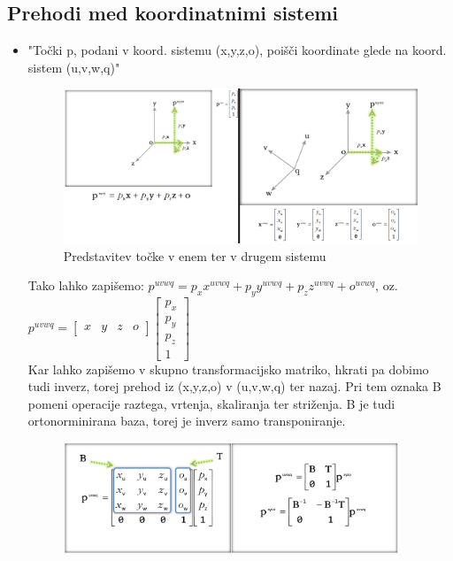 \documentclass{article}
\begin{document}
\subsection{Prehodi med koordinatnimi sistemi}
\begin{itemize}
    \item "Točki p, podani v koord. sistemu (x,y,z,o), poišči koordinate glede na koord. sistem (u,v,w,q)"
        \begin{figure}[H]
        \centering
        \includegraphics[width=150mm]{src/prehajanje_koord_sistemov_1.png}
        \caption{Predstavitev točke v enem ter v drugem sistemu}
        \end{figure} 
    Tako lahko zapišemo: $p^{uvwq} = p_xx^{uvwq} + p_yy^{uvwq} + p_zz^{uvwq} + o^{uvwq}$, oz. $p^{uvwq} = \begin{bmatrix} x & y & z & o \end{bmatrix} \begin{bmatrix} p_x \\ p_y \\ p_z \\ 1 \end{bmatrix}$ \\
    Kar lahko zapišemo v skupno transformacijsko matriko, hkrati pa dobimo tudi inverz, torej prehod iz (x,y,z,o) v (u,v,w,q) ter nazaj. Pri tem oznaka B pomeni operacije raztega, vrtenja, skaliranja ter striženja. B je tudi ortonorminirana baza, torej je inverz samo transponiranje.
        \begin{figure}[H]
        \centering
        \includegraphics[width=100mm]{src/prehajanje_koord_sistemov_2.png}
        \end{figure} 
\end{itemize}
\end{document}
